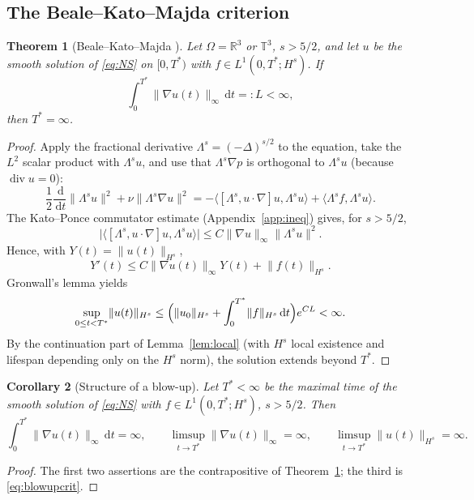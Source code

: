 \documentclass[11pt]{article}
\newtheorem{theorem}{Theorem}[section]
\newtheorem{corollary}[theorem]{Corollary}
\theoremstyle{remark}
\newcommand{\R}{\mathbb{R}}
\newcommand{\T}{\mathbb{T}}
\newcommand{\dd}{\,\mathrm{d}}
\newcommand{\norm}[1]{\lVert #1\rVert}
\newcommand{\abs}[1]{\lvert #1\rvert}
\newcommand{\ip}[2]{\langle #1,#2\rangle}
\newcommand{\Div}{\operatorname{div}}
\begin{document}
\subsection{The Beale--Kato--Majda criterion}

\begin{theorem}[Beale--Kato--Majda \cite{BKM1984}]\label{thm:BKM}
Let $\Omega=\R^3$ or $\T^3$, $s>5/2$, and let $u$ be the smooth solution of \eqref{eq:NS} on
$[0,T^*)$ with $f\in L^1(0,T^*;H^s)$. If
\begin{equation}\label{eq:BKMcond}
\int_0^{T^*}\norm{\nabla u(t)}_{\infty}\dd t=:L<\infty,
\end{equation}
then $T^*=\infty$.
\end{theorem}

\begin{proof}
Apply the fractional derivative $\Lambda^s=(-\Delta)^{s/2}$ to the equation, take the $L^2$
scalar product with $\Lambda^su$, and use that $\Lambda^s\nabla p$ is orthogonal to
$\Lambda^su$ (because $\Div u=0$):
\[
\frac12\frac{\dd}{\dd t}\norm{\Lambda^su}^2+\nu\norm{\Lambda^s\nabla u}^2
=-\ip{[\Lambda^s,u\cdot\nabla]u}{\Lambda^su}+\ip{\Lambda^sf}{\Lambda^su}.
\]
The Kato--Ponce commutator estimate (Appendix~\ref{app:ineq}) gives, for $s>5/2$,
\[
\abs{\ip{[\Lambda^s,u\cdot\nabla]u}{\Lambda^su}}
\le C\norm{\nabla u}_{\infty}\norm{\Lambda^su}^2 .
\]
Hence, with $Y(t)=\norm{u(t)}_{H^s}$,
\[
Y'(t)\le C\norm{\nabla u(t)}_{\infty}Y(t)+\norm{f(t)}_{H^s}.
\]
Gronwall's lemma yields
\[
\sup_{0\le t<T^*}\norm{u(t)}_{H^s}
\le\Bigl(\norm{u_0}_{H^s}+\int_0^{T^*}\norm{f}_{H^s}\dd t\Bigr)e^{CL}<\infty .
\]
By the continuation part of Lemma~\ref{lem:local} (with $H^s$ local existence and lifespan
depending only on the $H^s$ norm), the solution extends beyond $T^*$.
\end{proof}

\begin{corollary}[Structure of a blow-up]\label{cor:blowup}
Let $T^*<\infty$ be the maximal time of the smooth solution of \eqref{eq:NS} with
$f\in L^1(0,T^*;H^s)$, $s>5/2$. Then
\begin{equation}\label{eq:blowup}
\int_0^{T^*}\norm{\nabla u(t)}_{\infty}\dd t=\infty,
\qquad
\limsup_{t\to T^*}\norm{\nabla u(t)}_{\infty}=\infty,
\qquad
\limsup_{t\to T^*}\norm{u(t)}_{H^s}=\infty .
\end{equation}
\end{corollary}

\begin{proof}
The first two assertions are the contrapositive of Theorem~\ref{thm:BKM}; the third is
\eqref{eq:blowupcrit}.
\end{proof}
\end{document}
